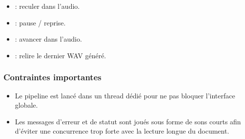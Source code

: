 \documentclass[letterpaper,10pt,french]{sphinxmanual}
\begin{document}
\begin{fulllineitems}
\begin{itemize}
\item {} 
\sphinxAtStartPar
{} : reculer dans l’audio.

\item {} 
\sphinxAtStartPar
{} : pause / reprise.

\item {} 
\sphinxAtStartPar
{} : avancer dans l’audio.

\item {} 
\sphinxAtStartPar
\sphinxtitleref{*} : relire le dernier WAV généré.

\end{itemize}


\subsubsection{Contraintes importantes}
\label{\detokenize{api/modes:contraintes-importantes}}\begin{itemize}
\item {} 
\sphinxAtStartPar
Le pipeline est lancé dans un thread dédié pour ne pas bloquer
l’interface globale.

\item {} 
\sphinxAtStartPar
Les messages d’erreur et de statut sont joués sous forme de sons
courts afin d’éviter une concurrence trop forte avec la lecture
longue du document.

\end{itemize}

\begin{fulllineitems}
\label{\detokenize{api/modes:modes.mode_reading_machine.ModeReadingMachine.KEY_CAPTURE}}
\pysigstartsignatures
\pysigline
{}
\pysigstopsignatures
\end{fulllineitems}


\begin{fulllineitems}
\label{\detokenize{api/modes:modes.mode_reading_machine.ModeReadingMachine.KEY_CANCEL}}
\pysigstartsignatures
\pysigline
{}
\pysigstopsignatures
\end{fulllineitems}


\end{fulllineitems}
\end{document}

